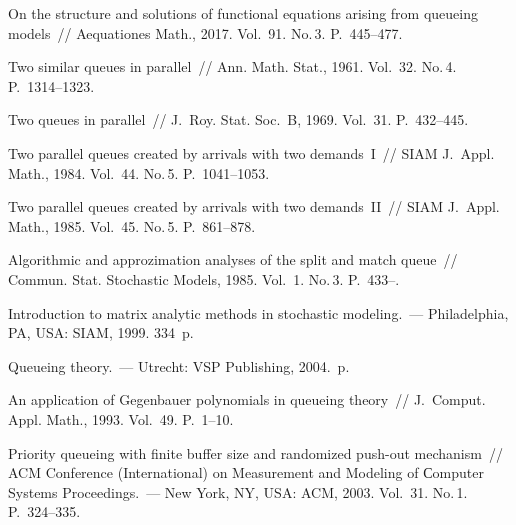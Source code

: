 \begin{multicols}{2}

\renewcommand{\bibname}{\protect\rmfamily Литература}

{\small\frenchspacing
{%
\begin{thebibliography}{99}

On the structure and solutions of functional equations arising from queueing models~// 
{Aequationes Math.}, 2017. Vol.~91. No.\,3. P.~445--477.

 Two similar queues in parallel~// {Ann. Math. Stat.}, 1961. 
Vol.~32. No.\,4. P.~1314--1323.


 Two queues in parallel~// J.~Roy. Stat. Soc.~B, 1969. 
Vol.~31. P.~432--445. %


 Two parallel queues created by arrivals with two demands~I~// 
{SIAM J.~Appl. Math.}, 1984. Vol.~44. No.\,5. P.~1041--1053.


 Two parallel queues created by arrivals with two demands~II~// 
{SIAM J.~Appl. Math.}, 1985. Vol.~45. No.\,5. P.~861--878.

 Algorithmic 
and approzimation analyses of the split and match queue~// 
{Commun. Stat. Stochastic Models}, 1985. Vol.~1. No.\,3. P.~433--.

{Introduction to matrix analytic methods in stochastic modeling}.~---  
Philadelphia, PA, USA: SIAM, 1999. 334~p.


{Queueing theory}.~--- Utrecht: VSP Publishing, 2004.~p.

 An application of Gegenbauer 
polynomials in queueing theory~// {J.~Comput. Appl. Math.}, 1993. Vol.~49. P.~1--10.

Priority queueing with finite buffer size and randomized push-out mechanism~// 
{ACM  Conference (International) on Measurement and Modeling of Сomputer 
Systems Proceedings}.~--- New York, NY, USA: ACM, 
2003. Vol.~31. No.\,1. P.~324--335.




\end{thebibliography}}}
\end{multicols}
